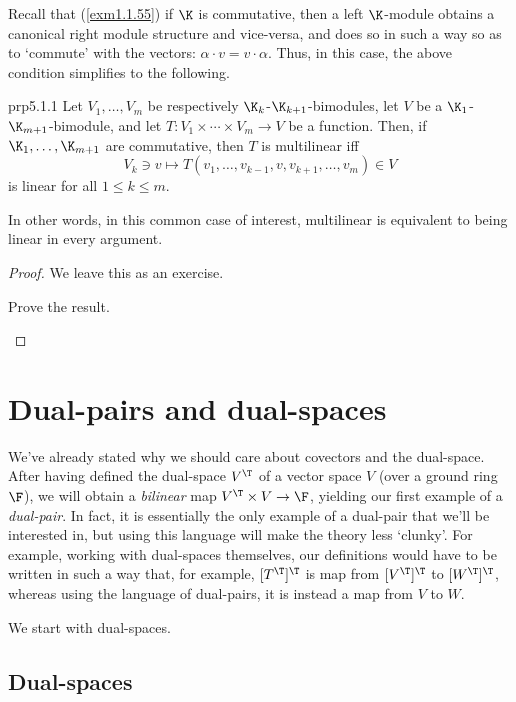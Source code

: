 Recall that (\cref{exm1.1.55}) if $\K$ is commutative, then a left $\K$-module obtains a canonical right module structure and vice-versa, and does so in such a way so as to `commute' with the vectors:  $\alpha \cdot v=v\cdot \alpha$.  Thus, in this case, the above condition simplifies to the following.
\begin{prp}{}{prp5.1.1}
	Let $V_1,\ldots ,V_m$ be respectively $\K _k$-$\K _{k+1}$-bimodules, let $V$ be a $\K _1$-$\K _{m+1}$-bimodule, and let $T\colon V_1\times \cdots \times V_m\rightarrow V$ be a function.  Then, if $\K _1,\ldots ,\K _{m+1}$ are commutative, then $T$ is multilinear iff
	\begin{equation}
	V_k\ni v\mapsto T(v_1,\ldots ,v_{k-1},v,v_{k+1},\ldots ,v_m)\in V
	\end{equation}
	is linear for all $1\leq k\leq m$.
	\begin{rmk}
		In other words, in this common case of interest, multilinear is equivalent to being linear in every argument.
	\end{rmk}
	\begin{proof}
		We leave this as an exercise.
		\begin{exr}[breakable=false]{}{}
			Prove the result.
		\end{exr}
	\end{proof}
\end{prp}

\section{Dual-pairs and dual-spaces}

We've already stated why we should care about covectors and the dual-space.  After having defined the dual-space $V^{\T}$ of a vector space $V$ (over a ground ring $\F$), we will obtain a \emph{bilinear} map $V^{\T}\times V\rightarrow \F$, yielding our first example of a \emph{dual-pair}.  In fact, it is essentially the only example of a dual-pair that we'll be interested in, but using this language will make the theory less `clunky'.  For example, working with dual-spaces themselves, our definitions would have to be written in such a way that, for example, $[T^{\T}]^{\T}$ is map from $[V^{\T}]^{\T}$ to $[W^{\T}]^{\T}$, whereas using the language of dual-pairs, it is instead a map from $V$ to $W$.

We start with dual-spaces.

\subsection{Dual-spaces}


